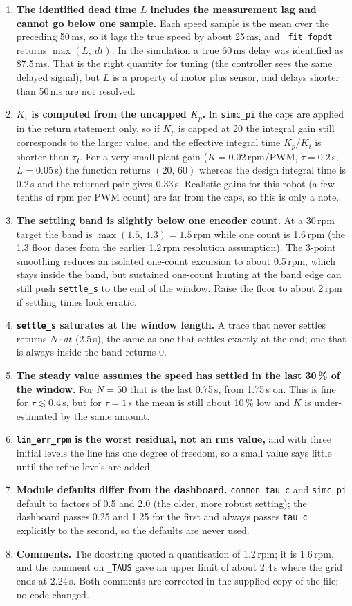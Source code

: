 \documentclass[11pt,a4paper]{report}
\newcommand{\code}[1]{\texttt{#1}}
\begin{document}
\begin{enumerate}
  \item \textbf{The identified dead time $L$ includes the measurement lag and cannot go below one sample.} Each speed sample is the mean over the preceding 50\,ms, so it lags the true speed by about 25\,ms, and \code{\_fit\_fopdt} returns $\max(L,\ dt)$. In the simulation a true 60\,ms delay was identified as 87.5\,ms. That is the right quantity for tuning (the controller sees the same delayed signal), but $L$ is a property of motor plus sensor, and delays shorter than 50\,ms are not resolved.
  \item \textbf{$K_i$ is computed from the uncapped $K_p$.} In \code{simc\_pi} the caps are applied in the return statement only, so if $K_p$ is capped at 20 the integral gain still corresponds to the larger value, and the effective integral time $K_p/K_i$ is shorter than $\tau_I$. For a very small plant gain ($K=0.02$\,rpm/PWM, $\tau=0.2$\,s, $L=0.05$\,s) the function returns $(20,\,60)$ whereas the design integral time is 0.2\,s and the returned pair gives 0.33\,s. Realistic gains for this robot (a few tenths of rpm per PWM count) are far from the caps, so this is only a note.
  \item \textbf{The settling band is slightly below one encoder count.} At a 30\,rpm target the band is $\max(1.5,\,1.3)=1.5$\,rpm while one count is 1.6\,rpm (the 1.3 floor dates from the earlier 1.2\,rpm resolution assumption). The 3-point smoothing reduces an isolated one-count excursion to about 0.5\,rpm, which stays inside the band, but sustained one-count hunting at the band edge can still push \code{settle\_s} to the end of the window. Raise the floor to about 2\,rpm if settling times look erratic.
  \item \textbf{\code{settle\_s} saturates at the window length.} A trace that never settles returns $N\cdot dt$ (2.5\,s), the same as one that settles exactly at the end; one that is always inside the band returns 0.
  \item \textbf{The steady value assumes the speed has settled in the last 30\,\% of the window.} For $N=50$ that is the last 0.75\,s, from 1.75\,s on. This is fine for $\tau\lesssim0.4$\,s, but for $\tau=1$\,s the mean is still about 10\,\% low and $K$ is under-estimated by the same amount.
  \item \textbf{\code{lin\_err\_rpm} is the worst residual, not an rms value,} and with three initial levels the line has one degree of freedom, so a small value says little until the refine levels are added.
  \item \textbf{Module defaults differ from the dashboard.} \code{common\_tau\_c} and \code{simc\_pi} default to factors of 0.5 and 2.0 (the older, more robust setting); the dashboard passes 0.25 and 1.25 for the first and always passes \code{tau\_c} explicitly to the second, so the defaults are never used.
  \item \textbf{Comments.} The docstring quoted a quantisation of 1.2\,rpm; it is 1.6\,rpm, and the comment on \code{\_TAUS} gave an upper limit of about 2.4\,s where the grid ends at 2.24\,s. Both comments are corrected in the supplied copy of the file; no code changed.
\end{enumerate}
\end{document}
